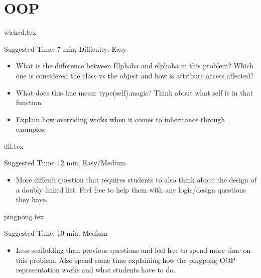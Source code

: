 \documentclass{exam}
\begin{document}
\section{OOP}
\begin{questions}
    {wicked.tex}
    \begin{questionmeta}
        Suggested Time: 7 min; Difficulty: Easy
        \begin{itemize}
            \item What is the difference between Elphaba and elphaba in this problem?  Which one is considered the class vs the object and how is attribute access affected?
            \item What does this line mean: type(self).magic? Think about what self is in that function
            \item Explain how overriding works when it comes to inheritance through examples. 
        \end{itemize}
      \end{questionmeta}    
      
      {dll.tex}
      \begin{questionmeta}
          Suggested Time: 12 min; Easy/Medium
          \begin{itemize}
              \item  More diffcult question that requires students to also think about the design of a doubly linked list. Feel free to help them with any logic/design questions they have. 
          \end{itemize}
        \end{questionmeta}

        \newpage

        {pingpong.tex}
        \begin{questionmeta}
            Suggested Time: 10 min; Medium
            \begin{itemize}
              \item  Less scaffolding than previous questions and feel free to spend more time on this problem. Also spend some time explaining how the pingpong OOP representation works and what students have to do. 
          \end{itemize}
        \end{questionmeta}
\end{questions}
\end{document}
